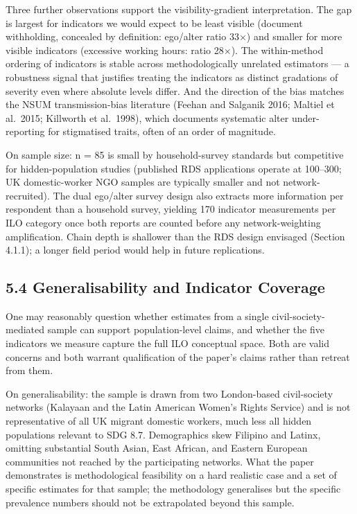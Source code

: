 \documentclass[
  12pt,
  letterpaper,
  DIV=11,
  numbers=noendperiod]{scrartcl}
\begin{document}
Three further observations support the visibility-gradient
interpretation. The gap is largest for indicators we would expect to be
least visible (document withholding, concealed by definition: ego/alter
ratio 33\(\times\)) and smaller for more visible indicators (excessive
working hours: ratio 28\(\times\)). The within-method ordering of
indicators is stable across methodologically unrelated estimators --- a
robustness signal that justifies treating the indicators as distinct
gradations of severity even where absolute levels differ. And the
direction of the bias matches the NSUM transmission-bias literature
(Feehan and Salganik 2016; Maltiel et al.~2015; Killworth et al.~1998),
which documents systematic alter under-reporting for stigmatised traits,
often of an order of magnitude.

On sample size: n = 85 is small by household-survey standards but
competitive for hidden-population studies (published RDS applications
operate at 100--300; UK domestic-worker NGO samples are typically
smaller and not network-recruited). The dual ego/alter survey design
also extracts more information per respondent than a household survey,
yielding 170 indicator measurements per ILO category once both reports
are counted before any network-weighting amplification. Chain depth is
shallower than the RDS design envisaged (Section 4.1.1); a longer field
period would help in future replications.

\subsection{5.4 Generalisability and Indicator
Coverage}\label{generalisability-and-indicator-coverage}

One may reasonably question whether estimates from a single
civil-society-mediated sample can support population-level claims, and
whether the five indicators we measure capture the full ILO conceptual
space. Both are valid concerns and both warrant qualification of the
paper's claims rather than retreat from them.

On generalisability: the sample is drawn from two London-based
civil-society networks (Kalayaan and the Latin American Women's Rights
Service) and is not representative of all UK migrant domestic workers,
much less all hidden populations relevant to SDG 8.7. Demographics skew
Filipino and Latinx, omitting substantial South Asian, East African, and
Eastern European communities not reached by the participating networks.
What the paper demonstrates is methodological feasibility on a hard
realistic case and a set of specific estimates for that sample; the
methodology generalises but the specific prevalence numbers should not
be extrapolated beyond this sample.
\end{document}
